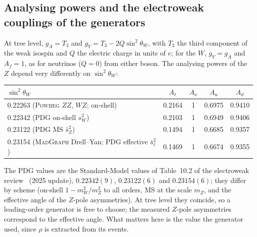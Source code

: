 \subsection{Analysing powers and the electroweak couplings of the generators}
\label{app:truth:couplings}
At tree level, $g_A = T_3$ and $g_V = T_3 - 2Q\sin^2\theta_W$, with $T_3$ the third component of the weak isospin and
$Q$ the electric charge in units of $e$; for the $W$, $g_V = g_A$ and $A_f = 1$, as for neutrinos ($Q = 0$) from either
boson. The analysing powers of the $Z$ depend very differently on $\sin^2\theta_W$:
\begin{center}
\small
\begin{tabular}{lcccc}
\toprule
$\sin^2\theta_W$ & $A_\ell$ & $A_\nu$ & $A_u$ & $A_d$ \\
\midrule
0.22263 (\textsc{Powheg} $ZZ$, $WZ$; on-shell) & 0.2164 & 1 & 0.6975 & 0.9410 \\
0.22342 (PDG on-shell $s_W^2$) & 0.2103 & 1 & 0.6949 & 0.9406 \\
0.23122 (PDG $\overline{\mathrm{MS}}$ $\hat s_Z^2$) & 0.1494 & 1 & 0.6685 & 0.9357 \\
0.23154 (\textsc{MadGraph} Drell--Yan; PDG effective $\bar s_\ell^2$) & 0.1469 & 1 & 0.6674 & 0.9355 \\
\bottomrule
\end{tabular}
\end{center}
The PDG values are the Standard-Model values of Table~10.2 of the electroweak review~\cite{ParticleDataGroup:2024cfk}
(2025 update), $0.22342(9)$, $0.23122(6)$ and $0.23154(6)$; they differ by scheme (on-shell $1 - m_W^2/m_Z^2$ to
all orders, $\overline{\mathrm{MS}}$ at the scale $m_Z$, and the effective angle of the $Z$-pole asymmetries). At tree
level they coincide, so a leading-order generator is free to choose; the measured $Z$-pole asymmetries correspond
to the effective angle. What matters here is the value the generator used, since $\rho$ is extracted from its events.


